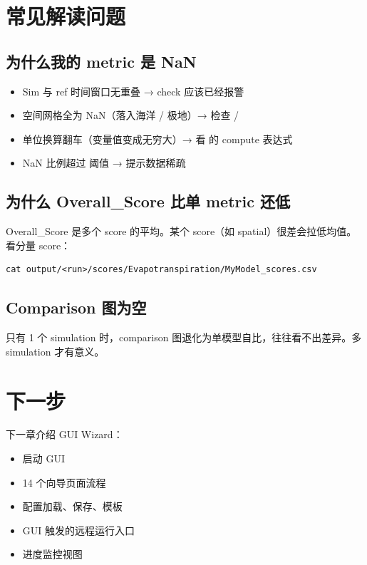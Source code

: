 
\section{常见解读问题}

\subsection{为什么我的 metric 是 NaN}

\begin{itemize}
  \item Sim 与 ref 时间窗口无重叠 → check 应该已经报警
  \item 空间网格全为 NaN（落入海洋 / 极地）→ 检查 /
  \item 单位换算翻车（变量值变成无穷大）→ 看  的 compute 表达式
  \item NaN 比例超过  阈值 → 提示数据稀疏
\end{itemize}

\subsection{为什么 Overall\_Score 比单 metric 还低}

Overall\_Score 是多个 score 的平均。某个 score（如 spatial）很差会拉低均值。看分量 score：

\begin{verbatim}
cat output/<run>/scores/Evapotranspiration/MyModel_scores.csv
\end{verbatim}

\subsection{Comparison 图为空}

只有 1 个 simulation 时，comparison 图退化为单模型自比，往往看不出差异。多 simulation 才有意义。

\section{下一步}

下一章介绍 GUI Wizard：

\begin{itemize}
  \item 启动 GUI
  \item 14 个向导页面流程
  \item 配置加载、保存、模板
  \item GUI 触发的远程运行入口
  \item 进度监控视图
\end{itemize}
